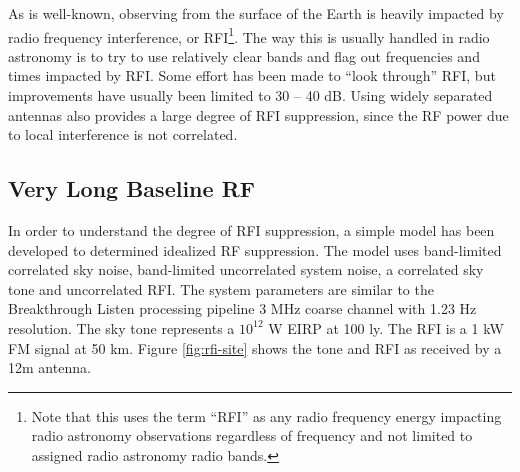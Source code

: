 As is well-known, observing from the surface of the Earth is heavily impacted by radio frequency interference, or RFI\footnote{Note that this uses the term ``RFI'' as any radio frequency energy impacting radio astronomy observations regardless of frequency and not limited to assigned radio astronomy radio bands.}.  The way this is usually handled in radio astronomy is to try to use relatively clear bands and flag out frequencies and times impacted by RFI.  Some effort has been made to ``look through'' RFI, but improvements have usually been limited to 30 -- 40 dB. Using widely separated antennas also provides a large degree of RFI suppression, since the RF power due to local interference is not correlated.

\subsection{Very Long Baseline RF}
In order to understand the degree of RFI suppression, a simple model has been developed to determined idealized RF suppression.  The model uses band-limited correlated sky noise, band-limited uncorrelated system noise, a correlated sky tone and uncorrelated RFI.  The system parameters are similar to the Breakthrough Listen processing pipeline 3 MHz coarse channel with 1.23 Hz resolution.  The sky tone represents a $10^{12}$ W EIRP at 100 ly.  The RFI is a 1 kW FM signal at 50 km.  Figure \ref{fig:rfi-site} shows the tone and RFI as received by a 12m antenna.